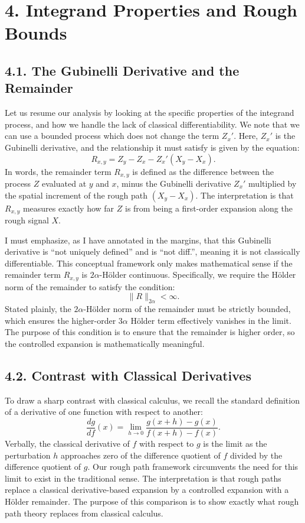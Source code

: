 \documentclass[11pt]{article}
\theoremstyle{definition}
\theoremstyle{remark}
\begin{document}
\section*{4. Integrand Properties and Rough Bounds}
\subsection*{4.1. The Gubinelli Derivative and the Remainder}
Let us resume our analysis by looking at the specific properties of the integrand process, and how we handle the lack of classical differentiability. We note that we can use a bounded process which does not change the term $Z_x'$. Here, $Z_x'$ is the Gubinelli derivative, and the relationship it must satisfy is given by the equation:
\[
R_{x,y}=Z_y-Z_x-Z_x'(X_y-X_x).
\]
In words, the remainder term $R_{x,y}$ is defined as the difference between the process $Z$ evaluated at $y$ and $x$, minus the Gubinelli derivative $Z_x'$ multiplied by the spatial increment of the rough path $(X_y-X_x)$.
The interpretation is that $R_{x,y}$ measures exactly how far $Z$ is from being a first-order expansion along the rough signal $X$.

I must emphasize, as I have annotated in the margins, that this Gubinelli derivative is ``not uniquely defined'' and is ``not diff.'', meaning it is not classically differentiable. This conceptual framework only makes mathematical sense if the remainder term $R_{x,y}$ is $2\alpha$-H\"older continuous. Specifically, we require the H\"older norm of the remainder to satisfy the condition:
\[
\|R\|_{2\alpha}<\infty.
\]
Stated plainly, the $2\alpha$-H\"older norm of the remainder must be strictly bounded, which ensures the higher-order $3\alpha$ H\"older term effectively vanishes in the limit.
The purpose of this condition is to ensure that the remainder is higher order, so the controlled expansion is mathematically meaningful.

\subsection*{4.2. Contrast with Classical Derivatives}
To draw a sharp contrast with classical calculus, we recall the standard definition of a derivative of one function with respect to another:
\[
\frac{dg}{df}(x)=\lim_{h\to0}\frac{g(x+h)-g(x)}{f(x+h)-f(x)}.
\]
Verbally, the classical derivative of $f$ with respect to $g$ is the limit as the perturbation $h$ approaches zero of the difference quotient of $f$ divided by the difference quotient of $g$. Our rough path framework circumvents the need for this limit to exist in the traditional sense.
The interpretation is that rough paths replace a classical derivative-based expansion by a controlled expansion with a Hölder remainder.
The purpose of this comparison is to show exactly what rough path theory replaces from classical calculus.
\end{document}
